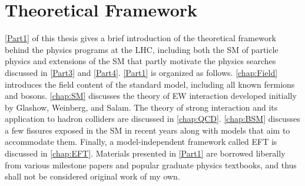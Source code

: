 \part{Theoretical Framework}
\label{Part1}
\autoref{Part1} of this thesis gives a brief introduction of the theoretical framework behind the physics programs at the \ac{LHC}, including both the \ac{SM} of particle physics and extensions of the \ac{SM} that partly motivate the physics searches discussed in \autoref{Part3} and \autoref{Part4}. \autoref{Part1} is organized as follows. \autoref{chap:Field} introduces the field content of the standard model, including all known fermions and bosons. \autoref{chap:SM} discusses the theory of \ac{EW} interaction developed initially by Glashow, Weinberg, and Salam. The theory of strong interaction and its application to hadron colliders are discussed in \autoref{chap:QCD}. \autoref{chap:BSM} discusses a few fissures exposed in the \ac{SM} in recent years along with models that aim to accommodate them. Finally, a model-independent framework called \ac{EFT} is discussed in \autoref{chap:EFT}. Materials presented in \autoref{Part1} are borrowed liberally from various milestone papers and popular graduate physics textbooks, and thus shall not be considered original work of my own. 






